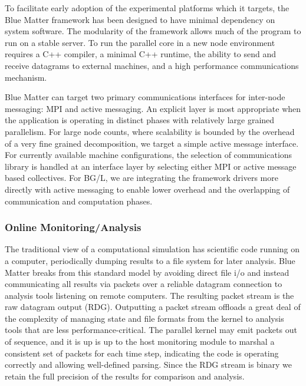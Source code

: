 \documentclass[doublespacing]{elsart}
\begin{document}

To facilitate early adoption of the experimental platforms which it
targets, the Blue Matter framework has been designed to have minimal
dependency on system software. The modularity of the framework allows
much of the program to run on a stable server.  To run the parallel
core in a new node environment requires a C++ compiler, a minimal C++
runtime, the ability to send and receive datagrams to external
machines, and a high performance communications mechanism.

Blue Matter can target two primary communications interfaces for
inter-node messaging: MPI and active messaging.  An explicit layer is
most appropriate when the application is operating in distinct phases
with relatively large grained parallelism.  For large node counts,
where scalability is bounded by the overhead of a very fine grained
decomposition, we target a simple active message interface. For
currently available machine configurations, the selection of
communications library is handled at an interface layer by selecting
either MPI or active message based collectives.  For BG/L, we are
integrating the framework drivers more directly with active messaging
to enable lower overhead and the overlapping of communication and
computation phases.

\subsubsection{Online Monitoring/Analysis}

The traditional view of a computational simulation has scientific code
running on a computer, periodically dumping results to a file system
for later analysis.  Blue Matter breaks from this standard model by
avoiding direct file i/o and instead communicating all results via
packets over a reliable datagram connection to analysis tools
listening on remote computers.  The resulting packet stream is the raw
datagram output (RDG).  Outputting a packet stream offloads a great
deal of the complexity of managing state and file formats from the
kernel to analysis tools that are less performance-critical. The
parallel kernel may emit packets out of sequence, and it is up is up
to the host monitoring module to marshal a consistent set of packets
for each time step, indicating the code is operating correctly and
allowing well-defined parsing.  Since the RDG stream is binary we
retain the full precision of the results for comparison and analysis.
\end{document}
